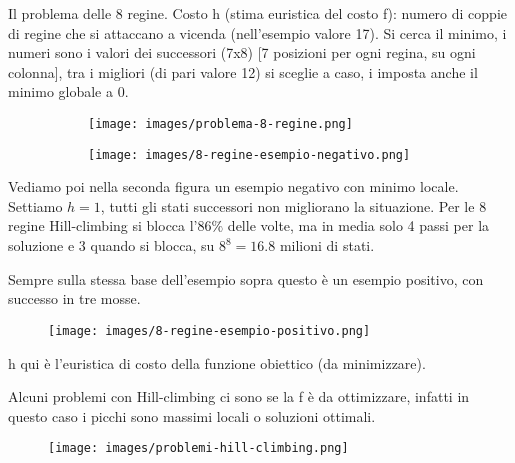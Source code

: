 \begin{example}
    Il problema delle 8 regine. Costo h (stima euristica del costo f): numero di coppie di regine che si attaccano a vicenda (nell'esempio valore 17).
    Si cerca il minimo, i numeri sono i valori dei successori (7x8) [7 posizioni per ogni regina, su ogni colonna], tra i migliori (di pari valore 12) si sceglie a caso,
    i imposta anche il minimo globale a 0.
    \begin{figure}[h!]
        \begin{subfigure}[b]{0.45\textwidth}
            \centering
            \texttt{[image: images/problema-8-regine.png]}
        \end{subfigure}
        \begin{subfigure}[b]{0.45\textwidth}
            \centering
            \texttt{[image: images/8-regine-esempio-negativo.png]}
        \end{subfigure}
    \end{figure}
    Vediamo poi nella seconda figura un esempio negativo con minimo locale. Settiamo $h=1$, tutti gli stati successori non migliorano la situazione. 
    Per le 8 regine Hill-climbing si blocca l'$86\%$ delle volte, ma in media solo 4 passi per la soluzione e 3 quando si blocca, su $8^8 = 16.8$ milioni di stati. 
\end{example}
\begin{example}
    Sempre sulla stessa base dell'esempio sopra questo è un esempio positivo, con successo in tre mosse.
    \begin{figure}[h!]
        \centering
        \texttt{[image: images/8-regine-esempio-positivo.png]}
    \end{figure}
    h qui è l'euristica di costo della funzione obiettico (da minimizzare).
\end{example}
Alcuni problemi con Hill-climbing ci sono se la f è da ottimizzare, infatti in questo caso i picchi sono massimi locali o soluzioni ottimali.
\begin{figure}[h!]
    \centering
    \texttt{[image: images/problemi-hill-climbing.png]}
\end{figure}


